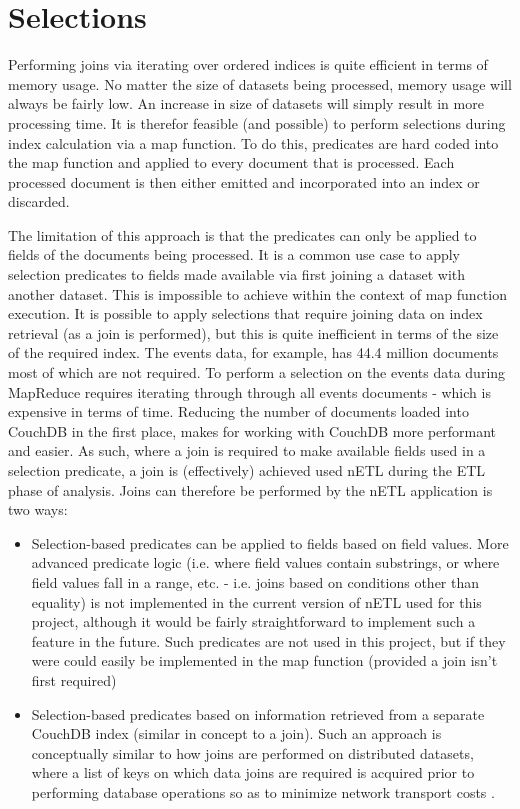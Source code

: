 \section{Selections}
Performing joins via iterating over ordered indices is quite efficient in terms of memory usage. No matter the size of datasets being processed, memory usage will always be fairly low. An increase in size of datasets will simply result in more processing time. It is therefor feasible (and possible) to perform selections during index calculation via a map function. To do this, predicates are hard coded into the map function and applied to every document that is processed. Each processed document is then either emitted and incorporated into an index or discarded.

The limitation of this approach is that the predicates can only be applied to fields of the documents being processed. It is a common use case to apply selection predicates to fields made available via first joining a dataset with another dataset. This is impossible to achieve within the context of map function execution. It is possible to apply selections that require joining data on index retrieval (as a join is performed), but this is quite inefficient in terms of the size of the required index. The events data, for example, has 44.4 million documents most of which are not required. To perform a selection on the events data during MapReduce requires iterating through through all events documents - which is expensive in terms of time. Reducing the number of documents loaded into CouchDB in the first place, makes for working with CouchDB more performant and easier. As such, where a join is required to make available fields used in a selection predicate, a join is (effectively) achieved used nETL during the ETL phase of analysis. Joins can therefore be performed by the nETL application is two ways:

\begin{itemize}
  \item Selection-based predicates can be applied to fields based on field values. More advanced predicate logic (i.e. where field values contain substrings, or where field values fall in a range, etc. - i.e. joins based on conditions other than equality) is not implemented in the current version of nETL used for this project, although it would be fairly straightforward to implement such a feature in the future. Such predicates are not used in this project, but if they were could easily be implemented in the map function (provided a join isn't first required)
  \item Selection-based predicates based on information retrieved from a separate CouchDB index (similar in concept to a join). Such an approach is conceptually similar to how joins are performed on distributed datasets, where a list of keys on which data joins are required is acquired prior to performing database operations so as to minimize network transport costs \cite{sonia2018}.
\end{itemize}

